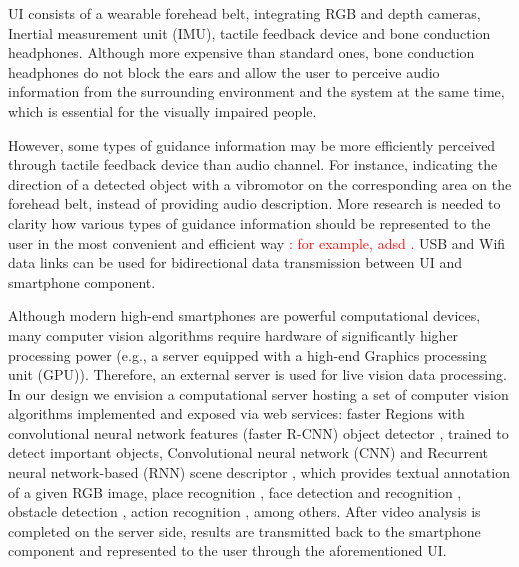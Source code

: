 \documentclass[10pt,conference,compsocconf]{IEEEtran}
\begin{document}

UI consists of a wearable forehead belt, integrating RGB and depth cameras, Inertial measurement unit (IMU), tactile feedback device and bone conduction headphones. Although more expensive than standard ones, bone conduction headphones do not block the ears and allow the user to perceive audio information from the surrounding environment and the system at the same time, which is essential for the visually impaired people. 


However, some types of guidance information may be more efficiently perceived through tactile feedback device than audio channel. For instance, indicating the direction of a detected object with a vibromotor on the corresponding area on the forehead belt, instead of providing audio description. More research is needed to clarity how various types of guidance information should be represented to the user in the most convenient and efficient way \textcolor{red}{: for example, adsd .} USB and Wifi data links can be used for bidirectional data transmission between UI and smartphone component.


Although modern high-end smartphones are powerful computational devices, many computer vision algorithms  require hardware of significantly higher processing power (e.g., a server equipped with a high-end Graphics processing unit (GPU)). Therefore, an external server is used for live vision data processing. In our design we envision a computational server hosting a set of computer vision algorithms implemented and exposed via web services: faster Regions with convolutional neural network features (faster R-CNN) object detector \cite{Ren}, trained to detect important objects, Convolutional neural network (CNN) and Recurrent neural network-based (RNN) scene descriptor \cite{Liu}, which provides textual annotation of a given RGB image, place recognition \cite{Ohn-Bar}, face detection and recognition \cite{Amos}, obstacle detection \cite{Laina}, action recognition \cite{Valor}, among others. After video analysis is completed on the server side, results are transmitted back to the smartphone component and represented to the user through the aforementioned UI.
\end{document}
